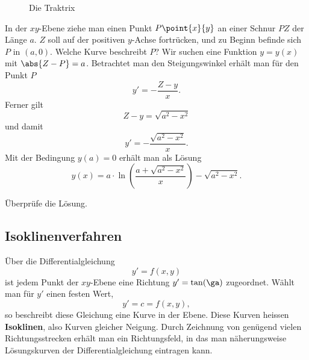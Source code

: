 \documentclass[%
draft,
11pt,%
twoside,%
titlepage,%
german,%
headsepline%
]{scrartcl}
\begin{document}
\begin{figure}
\vspace{-5pt}
\begin{center}
\end{center}
\caption{Die Traktrix}
\vspace{-5pt}
\end{figure}
In
der $xy$-Ebene ziehe man einen Punkt $P\point{x}{y}$ an einer Schnur $PZ$ der L\"ange $a$. $Z$ soll auf der positiven $y$-Achse fortr\"ucken, und zu Beginn befinde sich $P$ in $(a,0)$. Welche Kurve beschreibt $P$?
Wir suchen eine Funktion $y=y(x)$ mit $\abs{Z-P}=a$. Betrachtet man den Steigungswinkel erh\"alt man f\"ur den Punkt $P$
$$y'=-\frac{Z-y}{x}.$$
Ferner gilt
$$Z-y=\sqrt{a^2-x^2}$$ und damit
$$y'=-\frac{\sqrt{a^2-x^2}}{x}.$$
Mit der Bedingung $y(a)=0$ erh\"alt man als L\"osung
$$y(x)=a\cdot\ln\left(\frac{a+\sqrt{a^2-x^2}}{x}\right)-\sqrt{a^2-x^2}.$$

\begin{ueb}
\"Uberpr\"ufe die L\"osung.
\end{ueb}

\subsection{Isoklinenverfahren}

\"Uber die Differentialgleichung
$$y'=f(x,y)$$
ist jedem Punkt der $xy$-Ebene eine Richtung $y'=\tan(\ga)$ zugeordnet. W\"ahlt man f\"ur $y'$ einen festen Wert,
$$y'=c=f(x,y),$$
so beschreibt diese Gleichung eine Kurve in der Ebene.
Diese Kurven heissen \textbf{Isoklinen}, also Kurven gleicher Neigung. Durch Zeichnung von gen\"ugend vielen Richtungsstrecken erh\"alt man ein Richtungsfeld, in das man n\"aherungsweise L\"osungskurven der Differentialgleichung eintragen kann.
\end{document}

